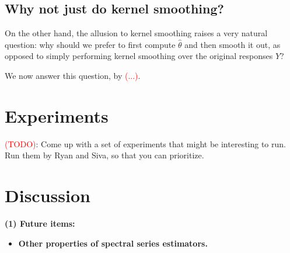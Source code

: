 \documentclass{article}
\newcommand{\1}{\mathbf{1}}
\newcommand{\wh}[1]{\widehat{#1}}
\theoremstyle{alden}
\theoremstyle{aldenthm}
\theoremstyle{definition}
\theoremstyle{remark}
\begin{document}
\subsection{Why not just do kernel smoothing?}
On the other hand, the allusion to kernel smoothing raises a very natural question: why should we prefer to first compute $\wh{\theta}$ and then smooth it out, as opposed to simply performing kernel smoothing over the original responses $Y$?

We now answer this question, by \textcolor{red}{(...)}.

\section{Experiments}
\label{sec:experiments}

\textcolor{red}{(TODO)}: Come up with a set of experiments that might be interesting to run. Run them by Ryan and Siva, so that you can prioritize.

\section{Discussion}
\label{sec:discussion}

\textbf{(1) Future items:}
\begin{itemize}
	\item \textbf{Other properties of spectral series estimators.}
\end{itemize}



 

\appendix


\end{document}
